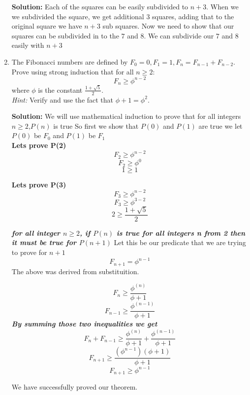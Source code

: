 \documentclass[12pt]{article}
\begin{document}
\begin{enumerate}
\begin{center}
\begin{tikzpicture}
            \end{tikzpicture}
        \end{center}
        \textbf{Solution: } Each of the squares can be easily subdivided to $n+3$. When we we subdivided the square, we get additional $3$ squares, adding that to the original square we have $n+3$ sub squares. Now we need to show that our squares can be subdivided in to the $7$ and $8$. We can subdivide our $7$ and $8$ easily with $n+3$

    \item The Fibonacci numbers are defined by $F_0 = 0, F_1 = 1, F_n = F_{n-1} + F_{n-2}$.  Prove  using strong induction that for all $n \geq 2$:
        \begin{equation*}
            F_n \geq \phi^{n-2}
        \end{equation*}
        where $\phi$ is the constant $\frac{1+\sqrt{5}}{2}$.  \\
        {\it Hint:} Verify and use the fact that $\phi + 1 = \phi^2$.

        \textbf{Solution: } We will use mathematical induction to prove that for all integers $n \geq 2$,$P(n)$ is true
        So first we show that $P(0)$ and $P(1)$ are true we let $P(0)$ be $F_0$ and $P(1)$ be $F_1$ \\

        \textbf{ Lets prove P(2) }
        \[ F_2  \geq \phi^{n-2} \]
        \[ F_2  \geq \phi^{0} \]
        \[ 1  \geq 1 \]

        \textbf{ Lets prove P(3) }
        \[ F_3  \geq \phi^{n-2} \]
        \[ F_3  \geq \phi^{3-2} \]
        \[ 2 \geq \frac{1+\sqrt{5}}{2} \]

        \textit{\textbf{
                for all integer $n \geq 2$, if $P(n)$ is true for all integers 
                n from 2 then it must be true for $P(n+1)$
            }}
        Let this be our predicate that we are trying to prove for $n+1$
        \[ F_{n+1} = \phi^{n-1} \]
        The above was derived from substituition.

        \[ F_{n} \geq \frac{\phi^{(n)}}{ \phi + 1} \]
        \[ F_{n-1} \geq \frac{\phi^{(n-1)}}{ \phi + 1} \]
        \textbf{\it{ By summing those two inequalities we get }}
        \[ F_{n} + F_{n-1} \geq \frac{\phi^{(n)}}{ \phi + 1} + \frac{\phi^{(n-1)}}{ \phi + 1} \]
        \[ F_{n+1} \geq \frac{(\phi^{n-1})(\phi + 1)}{ \phi + 1} \]
        \[ F_{n+1} \geq \phi^{n-1} \]

       We have successfully proved our theorem.
       


\end{enumerate}
\end{document}
